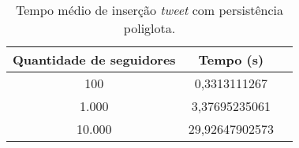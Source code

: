 \begin{table}[H]
    \centering
    \caption[Tempo médio de inserção \textit{tweet} com persistência poliglota]{Tempo médio de inserção \textit{tweet} com persistência poliglota.\label{tab:insert_poli}}
    \begin{tabular}{ccc}
        \hline
            Quantidade de seguidores & Tempo (s) \\
        \hline
            100  &   0,3313111267 \\
            1.000  & 3,37695235061 \\
            10.000 & 29,92647902573 \\
        \hline
    \end{tabular}
\end{table}
